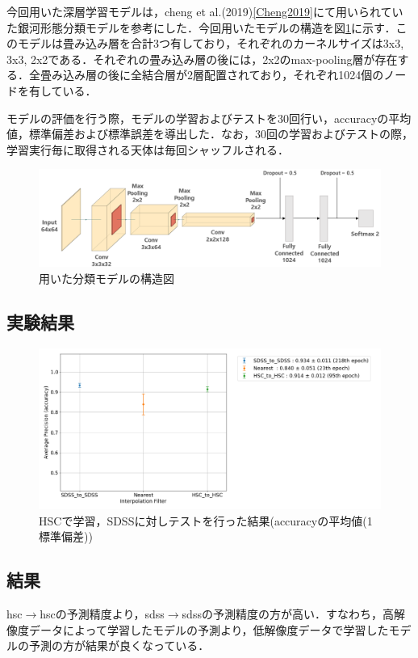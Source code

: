 \documentclass[a4j, 11pt]{jreport}
\begin{document}
今回用いた深層学習モデルは，cheng et al.(2019)\ref{Cheng2019}にて用いられていた銀河形態分類モデルを参考にした．今回用いたモデルの構造を図\ref{fig:model_shape_3}に示す．このモデルは畳み込み層を合計3つ有しており，それぞれのカーネルサイズは3x3, 3x3, 2x2である．それぞれの畳み込み層の後には，2x2のmax-pooling層が存在する．全畳み込み層の後に全結合層が2層配置されており，それぞれ1024個のノードを有している．

モデルの評価を行う際，モデルの学習およびテストを30回行い，accuracyの平均値，標準偏差および標準誤差を導出した．なお，30回の学習およびテストの際，学習実行毎に取得される天体は毎回シャッフルされる．

\begin{figure}[h]
	\centering
	\includegraphics[width=14cm]{images/model_shape.png}
	\caption{用いた分類モデルの構造図}
	\label{fig:model_shape_3}
\end{figure}

\subsection{実験結果}

\begin{figure}[H]
  \centering
  \includegraphics[width=1.0\hsize, keepaspectratio]{images/6syou/acc_with_errorbar_auto_epoch.png}
  \caption{HSCで学習，SDSSに対しテストを行った結果(accuracyの平均値(1標準偏差))}
  \label{fig:6syou_zikkenn}
\end{figure}

\subsection{結果}
hsc$\to$hscの予測精度より，sdss$\to$sdssの予測精度の方が高い．すなわち，高解像度データによって学習したモデルの予測より，低解像度データで学習したモデルの予測の方が結果が良くなっている．
\end{document}

